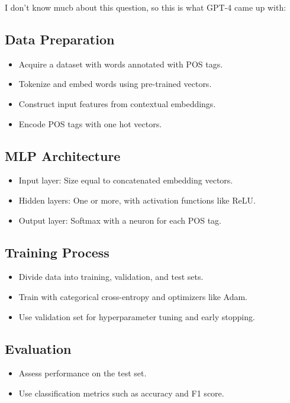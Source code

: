 \documentclass[11pt]{article}
\begin{document}
I don't know mucb about this question, so this is what GPT-4 came up with:

\subsection*{Data Preparation}
\begin{itemize}
    \item Acquire a dataset with words annotated with POS tags.
    \item Tokenize and embed words using pre-trained vectors.
    \item Construct input features from contextual embeddings.
    \item Encode POS tags with one hot vectors.
\end{itemize}

\subsection*{MLP Architecture}
\begin{itemize}
    \item Input layer: Size equal to concatenated embedding vectors.
    \item Hidden layers: One or more, with activation functions like ReLU.
    \item Output layer: Softmax with a neuron for each POS tag.
\end{itemize}

\subsection*{Training Process}
\begin{itemize}
    \item Divide data into training, validation, and test sets.
    \item Train with categorical cross-entropy and optimizers like Adam.
    \item Use validation set for hyperparameter tuning and early stopping.
\end{itemize}

\subsection*{Evaluation}
\begin{itemize}
    \item Assess performance on the test set.
    \item Use classification metrics such as accuracy and F1 score.
\end{itemize}
\end{document}
